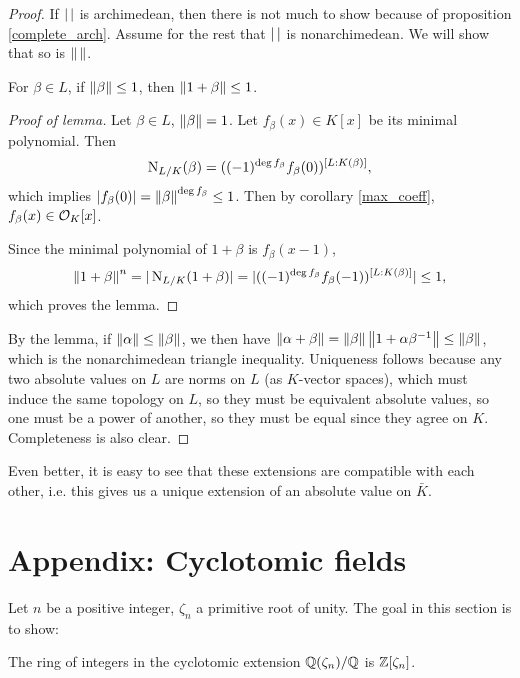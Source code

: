 \documentclass[11pt]{amsart}
\begin{document}
\begin{proof}
If $|\thinspace|$ is archimedean, then there is not much to show because of proposition \ref{complete_arch}. Assume for the rest that $|\thinspace|$ is nonarchimedean. We will show that so is $\left\| \thinspace \right\|$.

\begin{Lem}
For $\beta\in L$, if $\left\| \beta \right\|\le 1$, then $\left\| 1+\beta \right\| \le 1$.
\end{Lem} 

\begin{proof}[Proof of lemma]
Let $\beta\in L$, $\left\| \beta \right\| = 1$. Let $f_{\beta}(x)\in K[x]$ be its minimal polynomial. Then 
\[\operatorname{N}_{L/K}(\beta) = ((-1)^{\deg f_{\beta}} f_{\beta}(0))^{[L: K(\beta)]},\]
which implies $|f_{\beta}(0)| = \left\| \beta \right\|^{\deg f_{\beta}} \le 1$. Then by corollary \ref{max_coeff}, $f_{\beta}(x) \in \mathcal{O}_K[x]$. 

Since the minimal polynomial of $1+\beta$ is $f_{\beta}(x-1)$, 
\[\left\| 1+\beta \right\|^{n} = |\operatorname{N}_{L/K}(1+\beta)| = |((-1)^{\deg f_{\beta}} f_{\beta}(-1))^{[L:K(\beta)]}| \le 1,\]
which proves the lemma.
\end{proof}

By the lemma, if $\left\| \alpha \right\| \le \left\| \beta \right\|$, we then have $\left\| \alpha+\beta \right\| = \left\| \beta \right\|\left\| 1+\alpha\beta^{-1} \right\| \le \left\| \beta \right\|$, which is the nonarchimedean triangle inequality. Uniqueness follows because any two absolute values on $L$ are norms on $L$ (as $K$-vector spaces), which must induce the same topology on $L$, so they must be equivalent absolute values, so one must be a power of another, so they must be equal since they agree on $K$. Completeness is also clear.
\end{proof}

Even better, it is easy to see that these extensions are compatible with each other, i.e. this gives us a unique extension of an absolute value on $\bar{K}$.



\section{Appendix: Cyclotomic fields}


Let $n$ be a positive integer, $\zeta_n$ a primitive root of unity. The goal in this section is to show:

\begin{thm}
\label{cyclotomic_integers}
The ring of integers in the cyclotomic extension $\mathbb{Q}(\zeta_n)/\mathbb{Q}$ is $\mathbb{Z}[\zeta_n]$.
\end{thm}
\end{document}
